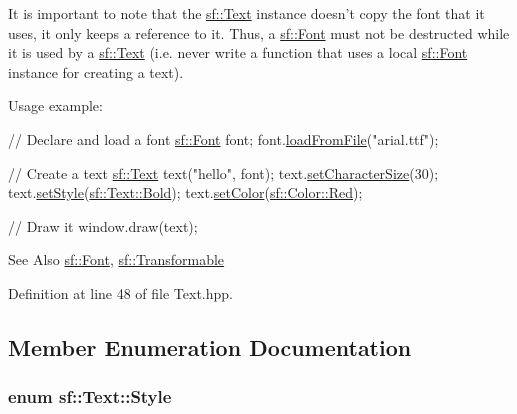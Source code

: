 It is important to note that the \hyperlink{classsf_1_1Text}{sf\-::\-Text} instance doesn't copy the font that it uses, it only keeps a reference to it. Thus, a \hyperlink{classsf_1_1Font}{sf\-::\-Font} must not be destructed while it is used by a \hyperlink{classsf_1_1Text}{sf\-::\-Text} (i.\-e. never write a function that uses a local \hyperlink{classsf_1_1Font}{sf\-::\-Font} instance for creating a text).

Usage example\-: 
\begin{DoxyCode}
\textcolor{comment}{// Declare and load a font}
\hyperlink{classsf_1_1Font}{sf::Font} font;
font.\hyperlink{classsf_1_1Font_ab020052ef4e01f6c749a85571c0f3fd1}{loadFromFile}(\textcolor{stringliteral}{"arial.ttf"});

\textcolor{comment}{// Create a text}
\hyperlink{classsf_1_1Text}{sf::Text} text(\textcolor{stringliteral}{"hello"}, font);
text.\hyperlink{classsf_1_1Text_ae96f835fc1bff858f8a23c5b01eaaf7e}{setCharacterSize}(30);
text.\hyperlink{classsf_1_1Text_ad791702bc2d1b6590a1719aa60635edf}{setStyle}(\hyperlink{classsf_1_1Text_aa8add4aef484c6e6b20faff07452bd82af1b47f98fb1e10509ba930a596987171}{sf::Text::Bold});
text.\hyperlink{classsf_1_1Text_afd1742fca1adb6b0ea98357250ffb634}{setColor}(\hyperlink{classsf_1_1Color_a127dbf55db9c07d0fa8f4bfcbb97594a}{sf::Color::Red});

\textcolor{comment}{// Draw it}
window.draw(text);
\end{DoxyCode}


\begin{DoxySeeAlso}{See Also}
\hyperlink{classsf_1_1Font}{sf\-::\-Font}, \hyperlink{classsf_1_1Transformable}{sf\-::\-Transformable} 
\end{DoxySeeAlso}


Definition at line 48 of file Text.\-hpp.



\subsection{Member Enumeration Documentation}
\hypertarget{classsf_1_1Text_aa8add4aef484c6e6b20faff07452bd82}{
\subsubsection[{Style}]{\setlength{\rightskip}{0pt plus 5cm}enum {\bf sf\-::\-Text\-::\-Style}}}\label{classsf_1_1Text_aa8add4aef484c6e6b20faff07452bd82}


